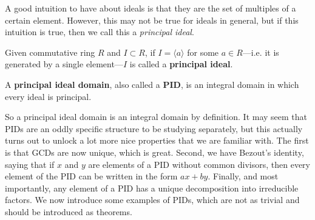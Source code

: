   A good intuition to have about ideals is that they are the set of multiples of a certain element. However, this may not be true for ideals in general, but if this intuition is true, then we call this a \textit{principal ideal}. 

  \begin{definition}
    Given commutative ring $R$ and $I \subset R$, if $I = \langle a \rangle$ for some $a \in R$---i.e. it is generated by a single element---$I$ is called a \textbf{principal ideal}. 
  \end{definition}

  \begin{definition}
    A \textbf{principal ideal domain}, also called a \textbf{PID}, is an integral domain in which every ideal is principal.  
  \end{definition}

  So a principal ideal domain is an integral domain by definition. It may seem that PIDs are an oddly specific structure to be studying separately, but this actually turns out to unlock a lot more nice properties that we are familiar with. The first is that GCDs are now unique, which is great. Second, we have Bezout's identity, saying that if $x$ and $y$ are elements of a PID without common divisors, then every element of the PID can be written in the form $a x + b y$. Finally, and most importantly, any element of a PID has a unique decomposition into irreducible factors. We now introduce some examples of PIDs, which are not as trivial and should be introduced as theorems. 

